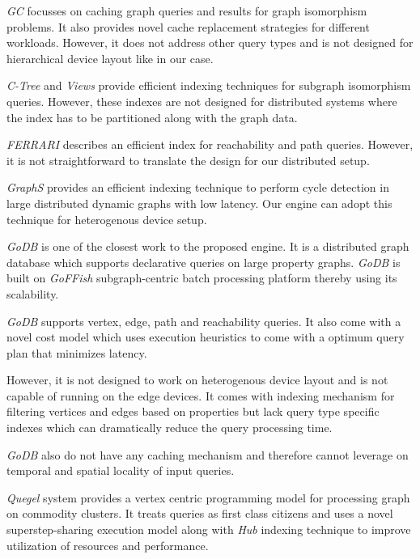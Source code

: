 \documentclass[conference]{IEEEtran}
\begin{document}
\emph{GC}\cite{enlighten130141} focusses on caching graph queries and results for graph isomorphism problems. It also provides novel cache replacement strategies for different workloads. However, it does not address other query types and is not designed for hierarchical device layout like in our case.

\emph{C-Tree}\cite{1617406} and \emph{Views}\cite{6816650} provide efficient indexing techniques for subgraph isomorphism queries. However, these indexes are not designed for distributed systems where the index has to be partitioned along with the graph data.

\emph{FERRARI}\cite{6544893} describes an efficient index for reachability and path queries. However, it is not straightforward to translate the design for our distributed setup.

\emph{GraphS}\cite{Qiu:2018:RCC:3229863.3275554} provides an efficient indexing technique to perform cycle detection in large distributed dynamic graphs with low latency. Our engine can adopt this technique for heterogenous device setup.  

\emph{GoDB}\cite{jamadagni:ccgrid:2016} is one of the closest work to the proposed engine. It is a distributed graph database which supports declarative queries on large property graphs. \emph{GoDB} is built on \emph{GoFFish}\cite{10.1007/978-3-319-09873-9_38} subgraph-centric batch processing platform thereby using its scalability.  

\emph{GoDB} supports vertex, edge, path and reachability queries. It also come with a novel cost model which uses execution heuristics to come with a optimum query plan that minimizes latency.

However, it is not designed to work on heterogenous device layout and is not capable of running on the edge devices. It comes with indexing mechanism for filtering vertices and edges based on properties but lack query type specific indexes which can dramatically reduce the query processing time.

\emph{GoDB} also do not have any caching mechanism and therefore cannot leverage on temporal and spatial locality of input queries. 

\emph{Quegel}\cite{Yan:2016:GQF:2904483.2904488} system provides a vertex centric programming model for processing graph on commodity clusters. It treats queries as first class citizens and uses a novel superstep-sharing execution model along with \emph{Hub} indexing technique to improve utilization of resources and performance.
\end{document}
